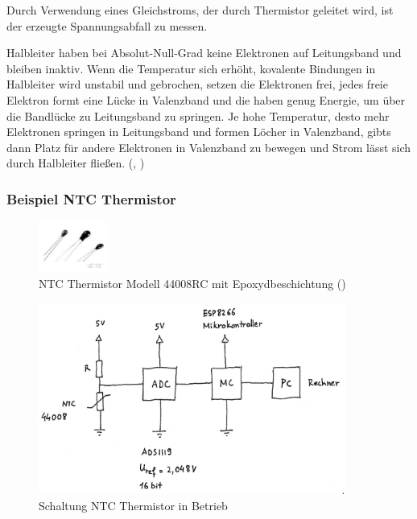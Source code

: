 \documentclass[12pt]{article}
\begin{document}
Durch Verwendung eines Gleichstroms, der durch Thermistor geleitet wird, ist der erzeugte Spannungsabfall zu messen.

Halbleiter haben bei Absolut-Null-Grad keine Elektronen auf Leitungsband und bleiben inaktiv. Wenn die Temperatur sich erhöht, kovalente Bindungen in Halbleiter wird unstabil und gebrochen, setzen die Elektronen frei, jedes freie Elektron formt eine Lücke in Valenzband und die haben genug Energie, um über die Bandlücke zu Leitungsband zu springen. Je hohe Temperatur, desto mehr Elektronen springen in Leitungsband und formen Löcher in Valenzband, gibts dann Platz für andere Elektronen in Valenzband zu bewegen und Strom lässt sich durch Halbleiter fließen. (\cite{TEConnectivity.2021}, \cite{Frank.})

\subsubsection{Beispiel NTC Thermistor}

\begin{figure}[h]
  \centering
  \label{fig:NTC}
  \includegraphics[width=0.2\textwidth]{NTC44008RC}
  \caption{NTC Thermistor Modell 44008RC mit Epoxydbeschichtung (\cite{TEConnectivity.2021c})}
\end{figure}

\begin{figure}[h]
  \centering
  \label{fig:ntcschaltung}
  \includegraphics[width=0.9\textwidth]{NTCSchaltung}
  \caption{Schaltung NTC Thermistor in Betrieb }
\end{figure}
\end{document}
